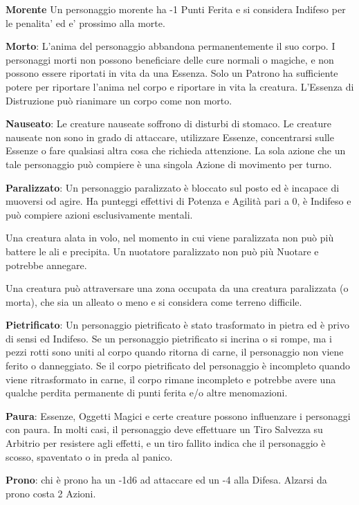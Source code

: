 \documentclass[a4paper,11pt,twoside,openany]{book}
\begin{document}
\textbf{Morente} Un personaggio morente ha -1 Punti Ferita e si considera Indifeso per le penalita' ed e' prossimo alla morte.

\textbf{Morto}: L'anima del personaggio abbandona permanentemente il suo corpo. I personaggi morti non possono beneficiare delle cure normali o magiche, e non possono essere riportati in vita da una Essenza. Solo un Patrono ha sufficiente potere per riportare l'anima nel corpo e riportare in vita la creatura. L'Essenza di Distruzione può rianimare un corpo come non morto.

\textbf{Nauseato}: Le creature nauseate soffrono di disturbi di stomaco.
Le creature nauseate non sono in grado di attaccare, utilizzare Essenze, concentrarsi sulle Essenze o fare qualsiasi altra cosa che richieda attenzione. La sola azione che un tale personaggio può compiere è una singola Azione di movimento per turno.

\textbf{Paralizzato}: Un personaggio paralizzato è bloccato sul posto ed è incapace di muoversi od agire. Ha punteggi effettivi di Potenza e Agilità pari a 0, è Indifeso e può compiere azioni esclusivamente mentali.

Una creatura alata in volo, nel momento in cui viene paralizzata non può più battere le ali e precipita.
Un nuotatore paralizzato non può più Nuotare e potrebbe annegare.

Una creatura può attraversare una zona occupata da una creatura paralizzata (o morta), che sia un alleato o meno e si considera come terreno difficile.

\textbf{Pietrificato}: Un personaggio pietrificato è stato trasformato in pietra ed è privo di sensi ed Indifeso. Se un personaggio pietrificato si incrina o si rompe, ma i pezzi rotti sono uniti al corpo quando ritorna di carne, il personaggio non viene ferito o danneggiato. Se il corpo pietrificato del personaggio è incompleto quando viene ritrasformato in carne, il corpo rimane incompleto e potrebbe avere una qualche perdita permanente di punti ferita e/o altre menomazioni.

\textbf{Paura}: Essenze, Oggetti Magici e certe creature possono influenzare i personaggi con paura. In molti casi, il personaggio deve effettuare un Tiro Salvezza su Arbitrio per resistere agli effetti, e un tiro fallito indica che il personaggio è scosso, spaventato o in preda al panico.

\textbf{Prono}: chi è prono ha un -1d6 ad attaccare ed un -4 alla Difesa. Alzarsi da prono costa 2 Azioni.
\end{document}
